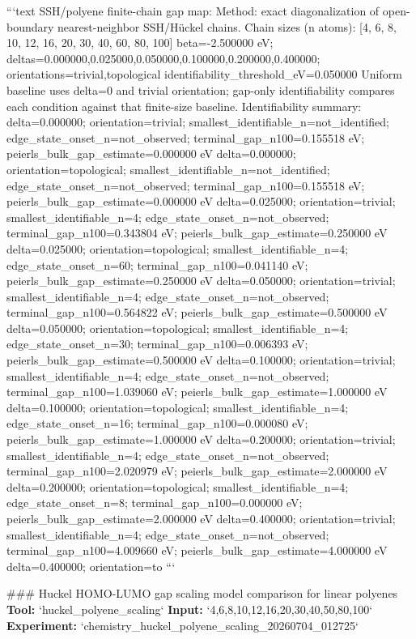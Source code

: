 \documentclass[11pt,a4paper]{article}
\begin{document}
```text
SSH/polyene finite-chain gap map:
  Method: exact diagonalization of open-boundary nearest-neighbor SSH/Hückel chains.
  Chain sizes (n atoms): [4, 6, 8, 10, 12, 16, 20, 30, 40, 60, 80, 100]
  beta=-2.500000 eV; deltas=0.000000,0.025000,0.050000,0.100000,0.200000,0.400000; orientations=trivial,topological
  identifiability\_threshold\_eV=0.050000
  Uniform baseline uses delta=0 and trivial orientation; gap-only identifiability compares each condition against that finite-size baseline.
  Identifiability summary:
  delta=0.000000; orientation=trivial; smallest\_identifiable\_n=not\_identified; edge\_state\_onset\_n=not\_observed; terminal\_gap\_n100=0.155518 eV; peierls\_bulk\_gap\_estimate=0.000000 eV
  delta=0.000000; orientation=topological; smallest\_identifiable\_n=not\_identified; edge\_state\_onset\_n=not\_observed; terminal\_gap\_n100=0.155518 eV; peierls\_bulk\_gap\_estimate=0.000000 eV
  delta=0.025000; orientation=trivial; smallest\_identifiable\_n=4; edge\_state\_onset\_n=not\_observed; terminal\_gap\_n100=0.343804 eV; peierls\_bulk\_gap\_estimate=0.250000 eV
  delta=0.025000; orientation=topological; smallest\_identifiable\_n=4; edge\_state\_onset\_n=60; terminal\_gap\_n100=0.041140 eV; peierls\_bulk\_gap\_estimate=0.250000 eV
  delta=0.050000; orientation=trivial; smallest\_identifiable\_n=4; edge\_state\_onset\_n=not\_observed; terminal\_gap\_n100=0.564822 eV; peierls\_bulk\_gap\_estimate=0.500000 eV
  delta=0.050000; orientation=topological; smallest\_identifiable\_n=4; edge\_state\_onset\_n=30; terminal\_gap\_n100=0.006393 eV; peierls\_bulk\_gap\_estimate=0.500000 eV
  delta=0.100000; orientation=trivial; smallest\_identifiable\_n=4; edge\_state\_onset\_n=not\_observed; terminal\_gap\_n100=1.039060 eV; peierls\_bulk\_gap\_estimate=1.000000 eV
  delta=0.100000; orientation=topological; smallest\_identifiable\_n=4; edge\_state\_onset\_n=16; terminal\_gap\_n100=0.000080 eV; peierls\_bulk\_gap\_estimate=1.000000 eV
  delta=0.200000; orientation=trivial; smallest\_identifiable\_n=4; edge\_state\_onset\_n=not\_observed; terminal\_gap\_n100=2.020979 eV; peierls\_bulk\_gap\_estimate=2.000000 eV
  delta=0.200000; orientation=topological; smallest\_identifiable\_n=4; edge\_state\_onset\_n=8; terminal\_gap\_n100=0.000000 eV; peierls\_bulk\_gap\_estimate=2.000000 eV
  delta=0.400000; orientation=trivial; smallest\_identifiable\_n=4; edge\_state\_onset\_n=not\_observed; terminal\_gap\_n100=4.009660 eV; peierls\_bulk\_gap\_estimate=4.000000 eV
  delta=0.400000; orientation=to
```

\#\#\# Huckel HOMO-LUMO gap scaling model comparison for linear polyenes
\textbf{Tool:} `huckel\_polyene\_scaling`
\textbf{Input:} `4,6,8,10,12,16,20,30,40,50,80,100`
\textbf{Experiment:} `chemistry\_huckel\_polyene\_scaling\_20260704\_012725`
\end{document}
